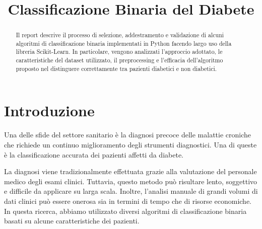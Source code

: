 \documentclass[conference]{IEEEtran}
\begin{document}
\title{Classificazione Binaria del Diabete}

\author{
\and
{}
\and
{}
\and
{}
\and
{}
}

\maketitle

\begin{abstract}
Il report descrive il processo di selezione, addestramento e validazione di alcuni algoritmi di classificazione binaria implementati in Python facendo largo uso della libreria Scikit-Learn.
In particolare, vengono analizzati l’approccio adottato, le caratteristiche del dataset utilizzato, il preprocessing e l’efficacia dell'algoritmo proposto nel distinguere correttamente tra pazienti diabetici e non diabetici.
\end{abstract}

\section{Introduzione}

Una delle sfide del settore sanitario è la diagnosi precoce delle malattie croniche che richiede un continuo miglioramento degli strumenti diagnostici. Una di queste è la classificazione accurata dei pazienti affetti da diabete. %

La diagnosi viene tradizionalmente effettuata grazie alla valutazione del personale medico degli esami clinici. Tuttavia, questo metodo può risultare lento, soggettivo e difficile da applicare su larga scala. Inoltre, l’analisi manuale di grandi volumi di dati clinici può essere onerosa sia in termini di tempo che di risorse economiche. 
In questa ricerca, abbiamo utilizzato diversi algoritmi di classificazione binaria basati su alcune caratteristiche dei pazienti.
\end{document}
